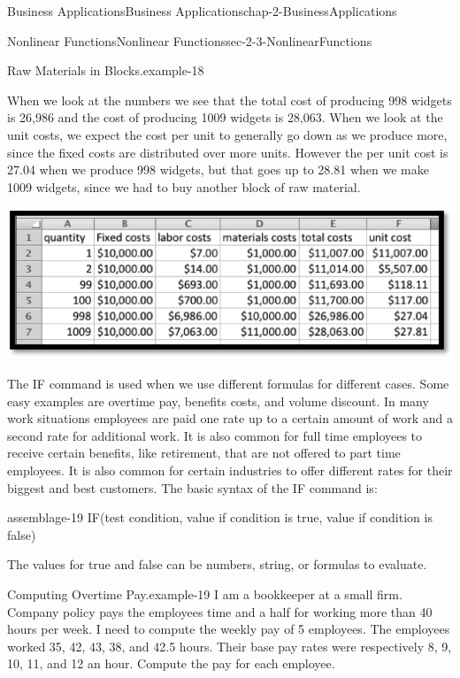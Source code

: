 \documentclass[oneside,10pt,]{book}
\numberwithin{equation}{section}
\begin{document}
\begin{chapterptx}{Business Applications}{}{Business Applications}{}{}{chap-2-BusinessApplications}
\begin{sectionptx}{Nonlinear Functions}{}{Nonlinear Functions}{}{}{sec-2-3-NonlinearFunctions}
\begin{example}{Raw Materials in Blocks.}{example-18}
\begin{sidebyside}{1}{0.1}{0.1}{0}
\end{sidebyside}%
\par
\hypertarget{p-787}{}%
When we look at the numbers we see that the total cost of producing 998 widgets is \textdollar{}26,986 and the cost of producing 1009 widgets is \textdollar{}28,063.  When we look at the unit costs, we expect the cost per unit to generally go down as we produce more, since the fixed costs are distributed over more units.  However the per unit cost is \textdollar{}27.04 when we produce 998 widgets, but that goes up to \textdollar{}28.81 when we make 1009 widgets, since we had to buy another block of raw material.%
\begin{sidebyside}{1}{0.2}{0.2}{0}%
\begin{sbspanel}{0.6}%
\includegraphics[width=1\linewidth]{images/sec2-3-6.png}
\end{sbspanel}%
\end{sidebyside}%
\end{example}
\hypertarget{p-788}{}%
The IF command is used when we use different formulas for different cases.  Some easy examples are overtime pay, benefits costs, and volume discount.  In many work situations employees are paid one rate up to a certain amount of work and a second rate for additional work.  It is also common for full time employees to receive certain benefits, like retirement, that are not offered to part time employees.  It is also common for certain industries to offer different rates for their biggest and best customers.  The basic syntax of the IF command is:%
\begin{assemblage}{}{assemblage-19}%
\hypertarget{p-789}{}%
IF(test condition, value if condition is true, value if condition is false)%
\end{assemblage}
\hypertarget{p-790}{}%
The values for true and false can be numbers, string, or formulas to evaluate.%
\begin{example}{Computing Overtime Pay.}{example-19}%
\hypertarget{p-791}{}%
I am a bookkeeper at a small firm.  Company policy pays the employees time and a half for working more than 40 hours per week.  I need to compute the weekly pay of 5 employees.  The employees worked 35, 42, 43, 38, and 42.5 hours.  Their base pay rates were respectively \textdollar{}8, \textdollar{}9, \textdollar{}10, \textdollar{}11, and \textdollar{}12 an hour.  Compute the pay for each employee.%

\end{example}
\end{sectionptx}
\end{chapterptx}
\end{document}
